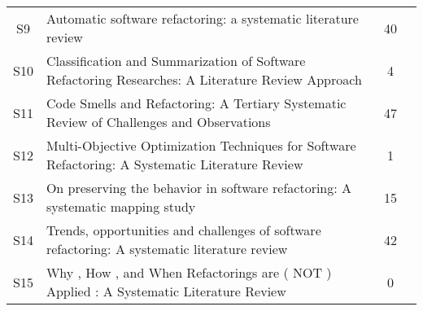 \begin{longtable}{cp{9cm}cp{3cm}}
S9  & Automatic software refactoring: a systematic literature review                                     & 40          & \citeauthor*{Baqais2020}                             \\
S10 & Classification and Summarization of Software Refactoring Researches: A Literature Review Approach  & 4           & \citeauthor*{Abebe2014b}                              \\
S11 & Code Smells and Refactoring: A Tertiary Systematic Review of Challenges and Observations           & 47          & \citeauthor*{Lacerda2020}                            \\
S12 & Multi-Objective Optimization Techniques for Software Refactoring: A Systematic Literature Review   & 1           & \citeauthor*{Rafique2019}                            \\
S13 & On preserving the behavior in software refactoring: A systematic mapping study                     & 15          & \citeauthor*{AlOmar2021}                             \\
S14 & Trends, opportunities and challenges of software refactoring: A systematic literature review       & 42          & \citeauthor*{Abebe2014a}                              \\
S15 & Why , How , and When Refactorings are ( NOT ) Applied : A Systematic Literature Review             & 0           & \citeauthor*{Buriakovskyi2018}                                
\end{longtable}
\FloatBarrier